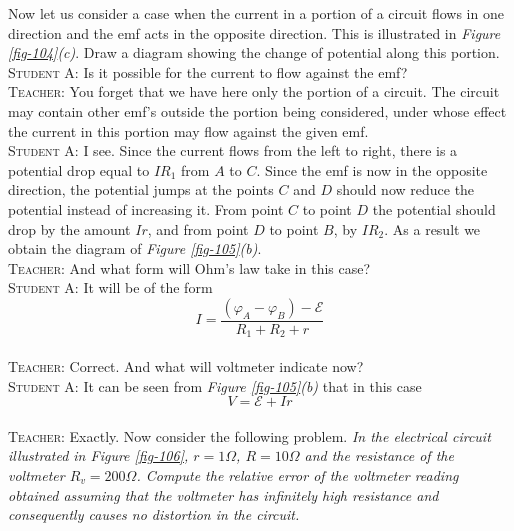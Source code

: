 \documentclass[a4paper,sfsidenotes]{tufte-book}
\newcommand{\Ea}{\mathcal{E}}
\begin{document}
Now let us consider a case when the current in a portion of  a circuit flows in one direction and the emf acts in the opposite direction. This is illustrated in \emph{Figure \ref{fig-104}(c)}. Draw a diagram showing the change of potential along this portion.
\\
\textsc{Student A:} Is it possible for the current to flow against the emf?
\\
\textsc{Teacher:} You forget that we have here only the portion of a circuit. The circuit may contain other emf's outside the portion being considered, under whose effect the current in this portion may flow against the given emf.
\\
\textsc{Student A:} I see. Since the current flows from the left to right, there is a potential drop equal to $IR_{1}$ from $A$ to $C$. Since the emf is now in the opposite direction, the potential jumps at the points $C$ and $D$ should now reduce the potential instead of increasing it. From point $C$ to point $D$ the potential should drop by the amount $Ir$, and from point $D$ to point $B$, by $IR_{2}$. As a result we obtain the diagram of \emph{Figure \ref{fig-105}(b)}.
\\
\textsc{Teacher:} And what form will Ohm's law take in this case?
\\
\textsc{Student A:} It will be of the form
\begin{equation}
I = \frac{ (\varphi_{A} - \varphi_{B}) - \Ea}{R_{1}+R_{2}+r} 
\label{eq-168}
\end{equation}
\\
\textsc{Teacher:} Correct. And what will voltmeter indicate now?
\\
\textsc{Student A:} It can be seen from \emph{Figure \ref{fig-105}(b)} that in this case
\begin{equation}
V = \Ea + Ir
\end{equation}
\\
\textsc{Teacher:} Exactly. Now consider the following problem. \emph{In the electrical circuit illustrated in \emph{Figure \ref{fig-106}}, $r=1 \Omega$, $R = 10 \Omega$ and the resistance of the voltmeter $R_{v} = 200 \Omega$. Compute the relative error of the voltmeter reading obtained assuming that the voltmeter has infinitely high resistance and consequently causes no distortion in the circuit.}
\\
\end{document}
